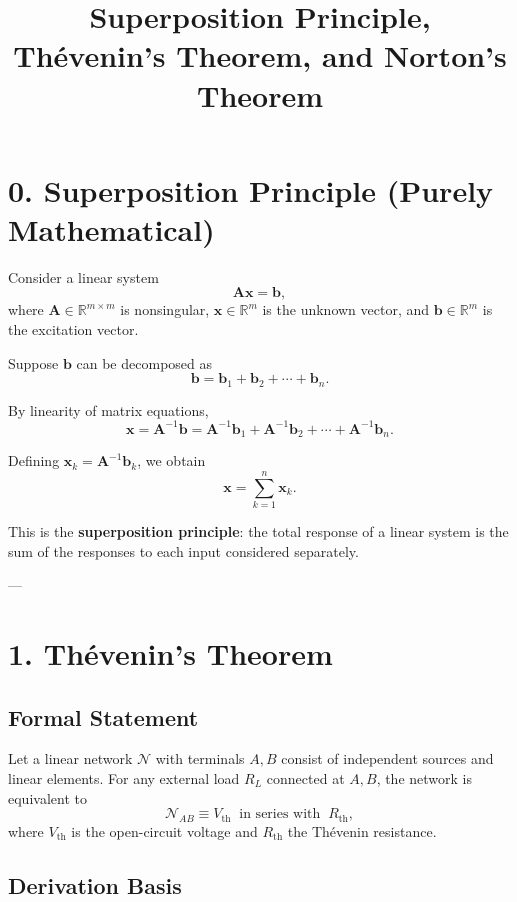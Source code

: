 \documentclass[12pt]{article}
\title{Superposition Principle, Thévenin's Theorem, and Norton's Theorem}
\author{}
\date{}
\begin{document}
	\maketitle
	
	\section*{0. Superposition Principle (Purely Mathematical)}
	
	Consider a linear system
	$$
	\mathbf{A}\mathbf{x} = \mathbf{b},
	$$
	where $\mathbf{A} \in \mathbb{R}^{m \times m}$ is nonsingular, 
	$\mathbf{x} \in \mathbb{R}^m$ is the unknown vector, 
	and $\mathbf{b} \in \mathbb{R}^m$ is the excitation vector.  
	
	Suppose $\mathbf{b}$ can be decomposed as
	$$
	\mathbf{b} = \mathbf{b}_1 + \mathbf{b}_2 + \cdots + \mathbf{b}_n.
	$$
	
	By linearity of matrix equations,
	$$
	\mathbf{x} = \mathbf{A}^{-1}\mathbf{b} 
	= \mathbf{A}^{-1}\mathbf{b}_1 + \mathbf{A}^{-1}\mathbf{b}_2 + \cdots + \mathbf{A}^{-1}\mathbf{b}_n.
	$$
	
	Defining $\mathbf{x}_k = \mathbf{A}^{-1}\mathbf{b}_k$, we obtain
	$$
	\mathbf{x} = \sum_{k=1}^n \mathbf{x}_k.
	$$
	
	This is the \textbf{superposition principle}: the total response of a linear system is the sum of the responses to each input considered separately.  
	
	---
	
	\section*{1. Thévenin's Theorem}
	
	\subsection*{Formal Statement}
	
	Let a linear network $\mathcal{N}$ with terminals $A,B$ consist of independent sources and linear elements.  
	For any external load $R_L$ connected at $A,B$, the network is equivalent to
	$$
	\mathcal{N}_{AB} \equiv V_{\text{th}} \;\; \text{in series with} \;\; R_{\text{th}},
	$$
	where $V_{\text{th}}$ is the open-circuit voltage and $R_{\text{th}}$ the Thévenin resistance.  
	
	\subsection*{Derivation Basis}
	
\end{document}
